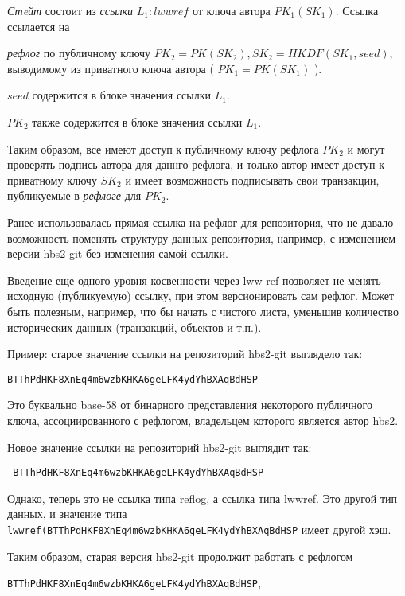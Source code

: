 \documentclass[11pt,a4paper]{article}
\begin{document}
\textit{Стeйт} состоит из \textit{ссылки} $L_1 : lwwref$ от ключа автора $PK_1(SK_1)$. Ссылка ссылается на

\textit{рефлог} по публичному ключу $PK_2 = PK(SK_2), SK_2 = HKDF(SK_1,seed)$, выводимому из приватного ключа автора
 ( $PK_1 = PK(SK_1)$ ).

 $seed$ содержится в блоке значения ссылки $L_1$.

 $PK_2$ также содержится в блоке значения ссылки $L_1$.

 Таким образом, все имеют доступ к публичному ключу рефлога $PK_2$ и могут проверять подпись автора
 для даннго рефлога, и только автор имеет доступ к  приватному ключу $SK_2$ и имеет возможность
 подписывать свои транзакции, публикуемые в \textit{рефлоге} для $PK_2$.

 Ранее использовалась прямая ссылка на рефлог для репозитория, что не давало возможность
 поменять структуру данных репозитория, например, с изменением версии hbs2-git без изменения
 самой ссылки.

 Введение еще одного уровня косвенности через lww-ref позволяет не менять исходную (публикуемую)
 ссылку, при этом версионировать сам рефлог. Может быть полезным, например, что бы начать с чистого
 листа, уменьшив количество исторических данных (транзакций, объектов и т.п.).

 Пример: старое значение ссылки на репозиторий hbs2-git выглядело так:

 \begin{verbatim}
BTThPdHKF8XnEq4m6wzbKHKA6geLFK4ydYhBXAqBdHSP
 \end{verbatim}

 Это буквально base-58 от бинарного представления некоторого публичного ключа, ассоциированного с
 рефлогом, владельцем которого является автор hbs2.

 Новое значение ссылки на репозиторий hbs2-git выглядит так:

 \begin{verbatim}
 BTThPdHKF8XnEq4m6wzbKHKA6geLFK4ydYhBXAqBdHSP
 \end{verbatim}

 Однако, теперь это не ссылка типа reflog, а ссылка типа lwwref. Это другой тип данных,
 и значение типа \texttt{lwwref(BTThPdHKF8XnEq4m6wzbKHKA6geLFK4ydYhBXAqBdHSP}
 имеет другой хэш.

 Таким образом, старая версия hbs2-git продолжит работать с рефлогом

 \texttt{BTThPdHKF8XnEq4m6wzbKHKA6geLFK4ydYhBXAqBdHSP},
\end{document}
